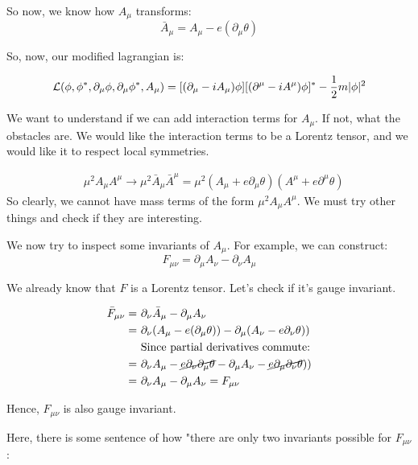 So now, we know how $A_\mu$ transforms:
\begin{equation}
    \boxed{\bar A_\mu = A_\mu - e(\partial_\mu \theta)}
\end{equation}

So, now, our modified lagrangian is:

\begin{align*}
    \mathcal{L} (\phi, \phi^*, \partial_\mu \phi, \partial_\mu \phi^*, A_\mu) =
    [(\partial_\mu - i A_\mu) \phi][(\partial^\mu - i A^\mu) \phi]^* - \frac{1}{2} m |\phi|^2
\end{align*}



We want to understand if we can add interaction terms for $A_\mu$. If not,
what the obstacles are. We would like the interaction terms to be a Lorentz
tensor, and we would like it to respect local symmetries.

\begin{align*}
    &\mu^2 A_\mu A^\mu \to \mu^2 \bar A_\mu \bar A^\mu = \mu^2 (A_\mu + e \partial_\mu \theta) (A^\mu + e \partial^\mu \theta)
\end{align*}
So clearly, we cannot have mass terms of the form $\mu^2 A_\mu A^\mu$. We must
try other things and check if they are interesting.

We now try to inspect some invariants of $A_\mu$.  For example, we can
construct:
$$F_{\mu\nu} = \partial_\mu A_\nu - \partial_\nu A_\mu$$

We already know that $F$ is a Lorentz tensor. Let's check if it's gauge
invariant.

\begin{align*}
    \bar F_{\mu\nu} =~&\partial_\nu \bar A_\mu - \partial_\mu A_\nu \\
    =~&\partial_\nu(A_\mu - e (\partial_\mu \theta)) - \partial_\mu (A_\nu - e \partial_\nu \theta)) \\
      &\text{Since partial derivatives commute:} \\
    =~&\partial_\nu A_\mu - \cancel{e \partial_\nu \partial_\mu \theta} - \partial_\mu A_\nu - \cancel{e \partial_\mu \partial_\nu \theta})) \\
    =~&\partial_\nu A_\mu - \partial_\mu A_\nu = F_{\mu \nu}
\end{align*}

Hence, $F_{\mu \nu}$ is also gauge invariant.

Here, there is some sentence of how "there are only two invariants possible
for $F_{\mu \nu}$:

